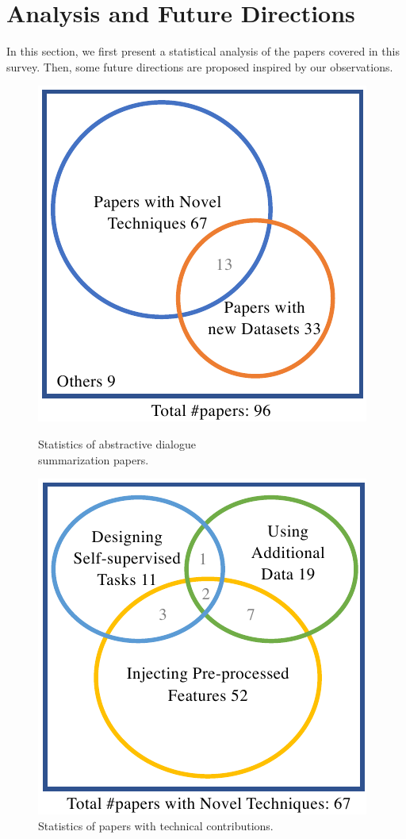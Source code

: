 \section{Analysis and Future Directions}
In this section, we first present a statistical analysis of the papers 
covered in this survey. Then, some future directions are proposed inspired by
our observations.
\begin{figure}[htbp]
	\centering
	\begin{minipage}[t]{0.45\linewidth}
		\centering
		\includegraphics[scale=0.6]{fig/distribution1.pdf}
		\caption{Statistics of abstractive dialogue \\summarization papers.}
		\label{fig:papers}
	\end{minipage}
	\begin{minipage}[t]{0.45\linewidth}
		\centering
		\includegraphics[scale=0.6]{fig/distribution2.pdf}
		\caption{Statistics of papers with technical contributions.}
		\label{fig:technical}
	\end{minipage}
\end{figure}
